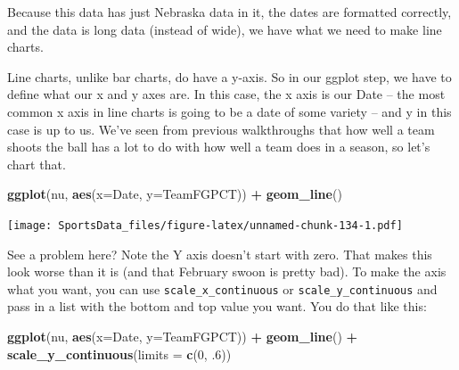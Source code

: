 \documentclass[]{book}
\newenvironment{Shaded}{\begin{snugshade}}{\end{snugshade}}
\newcommand{\KeywordTok}[1]{\textcolor[rgb]{0.13,0.29,0.53}{\textbf{#1}}}
\newcommand{\DataTypeTok}[1]{\textcolor[rgb]{0.13,0.29,0.53}{#1}}
\newcommand{\DecValTok}[1]{\textcolor[rgb]{0.00,0.00,0.81}{#1}}
\newcommand{\StringTok}[1]{\textcolor[rgb]{0.31,0.60,0.02}{#1}}
\newcommand{\OperatorTok}[1]{\textcolor[rgb]{0.81,0.36,0.00}{\textbf{#1}}}
\newcommand{\NormalTok}[1]{#1}
\begin{document}
\begin{Shaded}
\end{Shaded}

Because this data has just Nebraska data in it, the dates are formatted
correctly, and the data is long data (instead of wide), we have what we
need to make line charts.

Line charts, unlike bar charts, do have a y-axis. So in our ggplot step,
we have to define what our x and y axes are. In this case, the x axis is
our Date -- the most common x axis in line charts is going to be a date
of some variety -- and y in this case is up to us. We've seen from
previous walkthroughs that how well a team shoots the ball has a lot to
do with how well a team does in a season, so let's chart that.

\begin{Shaded}
\begin{Highlighting}[]
\KeywordTok{ggplot}\NormalTok{(nu, }\KeywordTok{aes}\NormalTok{(}\DataTypeTok{x=}\NormalTok{Date, }\DataTypeTok{y=}\NormalTok{TeamFGPCT)) }\OperatorTok{+}\StringTok{ }\KeywordTok{geom_line}\NormalTok{()}
\end{Highlighting}
\end{Shaded}

\texttt{[image: SportsData\_files/figure-latex/unnamed-chunk-134-1.pdf]}

See a problem here? Note the Y axis doesn't start with zero. That makes
this look worse than it is (and that February swoon is pretty bad). To
make the axis what you want, you can use \texttt{scale\_x\_continuous}
or \texttt{scale\_y\_continuous} and pass in a list with the bottom and
top value you want. You do that like this:

\begin{Shaded}
\begin{Highlighting}[]
\KeywordTok{ggplot}\NormalTok{(nu, }\KeywordTok{aes}\NormalTok{(}\DataTypeTok{x=}\NormalTok{Date, }\DataTypeTok{y=}\NormalTok{TeamFGPCT)) }\OperatorTok{+}\StringTok{ }\KeywordTok{geom_line}\NormalTok{() }\OperatorTok{+}\StringTok{ }\KeywordTok{scale_y_continuous}\NormalTok{(}\DataTypeTok{limits =} \KeywordTok{c}\NormalTok{(}\DecValTok{0}\NormalTok{, .}\DecValTok{6}\NormalTok{))}
\end{Highlighting}
\end{Shaded}
\end{document}
